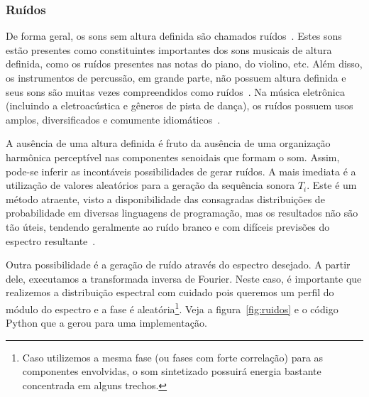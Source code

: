 \subsubsection{Ruídos}
De forma geral, os sons sem altura definida 
são chamados ruídos~\cite{Lacerda}.
Estes sons estão presentes como constituintes importantes dos sons musicais de altura definida,
como os ruídos presentes nas notas do piano, do violino, etc. Além disso, os instrumentos
de percussão, em grande parte, não possuem altura definida e seus sons
são muitas vezes compreendidos como ruídos~\cite{Roederer}. Na música eletrônica (incluindo
a eletroacústica e gêneros de pista de dança), os ruídos possuem usos amplos, diversificados e comumente
idiomáticos~\cite{Cook}.

A ausência de uma altura definida é fruto da ausência de uma organização harmônica perceptível nas componentes senoidais que formam o som. Assim, pode-se inferir
as incontáveis possibilidades de gerar ruídos. A mais imediata é a utilização
de valores aleatórios para a geração da sequência sonora $T_i$. Este
é um método atraente, visto a disponibilidade
das consagradas distribuições de probabilidade em diversas linguagens de programação,
mas os resultados não são tão úteis, tendendo geralmente ao ruído branco
e com difíceis previsões do espectro resultante~\cite{Cook}.

Outra possibilidade é a geração de ruído através do espectro desejado. A partir
dele, executamos a transformada inversa de Fourier. Neste caso, é importante
que realizemos a distribuição espectral com cuidado pois queremos um perfil
do módulo do espectro e a fase é aleatória\footnote{Caso utilizemos a mesma fase
(ou fases com forte correlação) para
as componentes envolvidas, o som sintetizado possuirá energia bastante concentrada
em alguns trechos.}. Veja a figura~\ref{fig:ruidos} e o código Python que a gerou para uma implementação.


